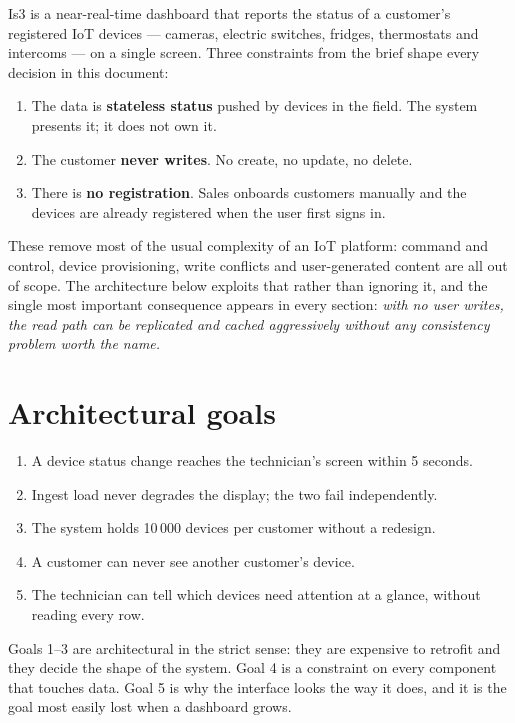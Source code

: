\documentclass[11pt,a4paper]{article}
\begin{document}
Is3 is a near-real-time dashboard that reports the status of a customer's registered
IoT devices --- cameras, electric switches, fridges, thermostats and intercoms --- on
a single screen. Three constraints from the brief shape every decision in this
document:

\begin{enumerate}
  \item The data is \textbf{stateless status} pushed by devices in the field. The
        system presents it; it does not own it.
  \item The customer \textbf{never writes}. No create, no update, no delete.
  \item There is \textbf{no registration}. Sales onboards customers manually and the
        devices are already registered when the user first signs in.
\end{enumerate}

These remove most of the usual complexity of an IoT platform: command and control,
device provisioning, write conflicts and user-generated content are all out of scope.
The architecture below exploits that rather than ignoring it, and the single most
important consequence appears in every section: \emph{with no user writes, the read
path can be replicated and cached aggressively without any consistency problem worth
the name.}

\section{Architectural goals}

\begin{enumerate}
  \item A device status change reaches the technician's screen within 5 seconds.
  \item Ingest load never degrades the display; the two fail independently.
  \item The system holds 10\,000 devices per customer without a redesign.
  \item A customer can never see another customer's device.
  \item The technician can tell which devices need attention at a glance, without
        reading every row.
\end{enumerate}

Goals 1--3 are architectural in the strict sense: they are expensive to retrofit and
they decide the shape of the system. Goal 4 is a constraint on every component that
touches data. Goal 5 is why the interface looks the way it does, and it is the goal
most easily lost when a dashboard grows.
\end{document}
